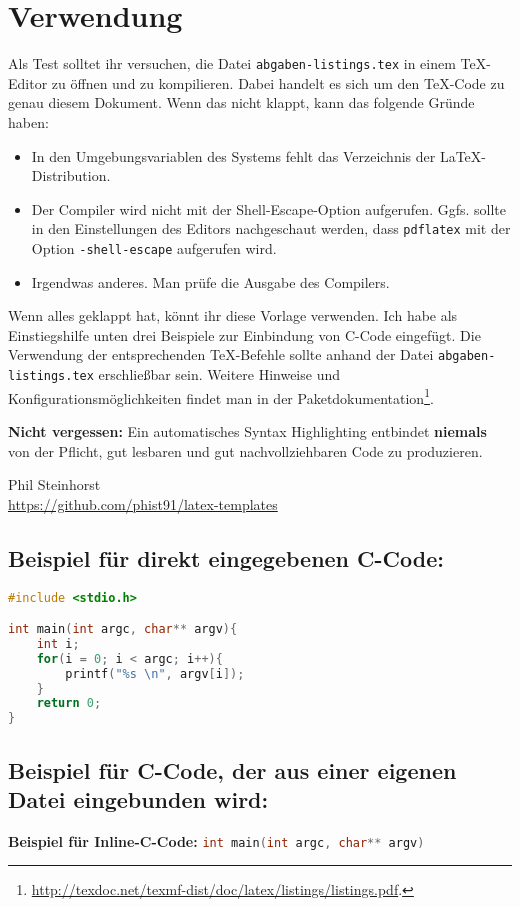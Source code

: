 \section*{Verwendung}
Als Test solltet ihr versuchen, die Datei \texttt{abgaben-listings.tex} in einem TeX-Editor zu öffnen und zu kompilieren.
Dabei handelt es sich um den TeX-Code zu genau diesem Dokument.
Wenn das nicht klappt, kann das folgende Gründe haben:
\begin{itemize}
	\item In den Umgebungsvariablen des Systems fehlt das Verzeichnis der \LaTeX-Distribution.
	\item Der Compiler wird nicht mit der Shell-Escape-Option aufgerufen.
		Ggfs. sollte in den Einstellungen des Editors nachgeschaut werden, dass \texttt{pdflatex} mit der Option \texttt{-shell-escape} aufgerufen wird.
	\item Irgendwas anderes. Man prüfe die Ausgabe des Compilers.
\end{itemize}
Wenn alles geklappt hat, könnt ihr diese Vorlage verwenden.
Ich habe als Einstiegshilfe unten drei Beispiele zur Einbindung von C-Code eingefügt.
Die Verwendung der entsprechenden TeX-Befehle sollte anhand der Datei \texttt{abgaben-listings.tex} erschließbar sein.
Weitere Hinweise und Konfigurationsmöglichkeiten findet man in der Paketdokumentation\footnote{\url{http://texdoc.net/texmf-dist/doc/latex/listings/listings.pdf}.}.

\textbf{Nicht vergessen:} Ein automatisches Syntax Highlighting entbindet \textbf{niemals} von der Pflicht, gut lesbaren und gut nachvollziehbaren Code zu produzieren.

\begin{flushright}
Phil Steinhorst \\
\url{https://github.com/phist91/latex-templates}
\end{flushright}

\newpage

\subsection*{Beispiel für direkt eingegebenen C-Code:}

\begin{lstlisting}[language=c]
#include <stdio.h>

int main(int argc, char** argv){
	int i;
	for(i = 0; i < argc; i++){
		printf("%s \n", argv[i]);
	}
	return 0;
}
\end{lstlisting}


\subsection*{Beispiel für C-Code, der aus einer eigenen Datei eingebunden wird:}




\textbf{Beispiel für Inline-C-Code:} \lstinline[language=c]|int main(int argc, char** argv)|


